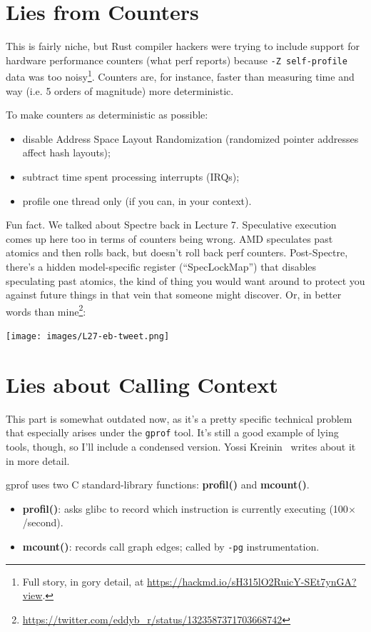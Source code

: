 \documentclass[a4paper]{report}
\begin{document}
\section*{Lies from Counters}
This is fairly niche, but Rust compiler hackers were trying to include
support for hardware performance counters (what perf reports) because
{\tt -Z self-profile} data was too noisy\footnote{Full story, in gory
detail,
at \url{https://hackmd.io/sH315lO2RuicY-SEt7ynGA?view}.}. Counters
are, for instance, faster than measuring time and way (i.e. 5 orders of magnitude) more deterministic.

To make counters as deterministic as possible:
\begin{itemize}[noitemsep]
\item disable Address Space Layout Randomization (randomized pointer addresses affect hash layouts);
\item subtract time spent processing interrupts (IRQs);
\item profile one thread only (if you can, in your context).
\end{itemize}
Fun fact. We talked about Spectre back in Lecture 7. Speculative execution comes up here too in terms of
counters being wrong. AMD speculates past atomics and then rolls back, but doesn't roll back perf counters.
Post-Spectre, there's a hidden model-specific register (``SpecLockMap'') that disables speculating past atomics, the kind of thing you would
want around to protect you against future things in that vein that someone might discover. Or, in better words than mine\footnote{\url{https://twitter.com/eddyb_r/status/1323587371703668742}}:

\begin{center}
\texttt{[image: images/L27-eb-tweet.png]}
\end{center}

\section*{Lies about Calling Context}
This part is somewhat outdated now, as it's a pretty specific technical problem that especially arises under the {\tt gprof} tool. It's still a good example of lying tools, though,
so I'll include a condensed version. Yossi Kreinin~\cite{lies} writes about it in more detail.

gprof uses two C standard-library functions: {\bf profil()} and {\bf mcount()}.

\vspace*{-1em}
\begin{itemize}[noitemsep]
\item {\bf profil()}: asks glibc to record which instruction 
  is currently executing (100$\times$/second).
\item {\bf mcount()}: records call graph edges; called by {\tt -pg} instrumentation.
\end{itemize}
\vspace*{-1em}
\end{document}
